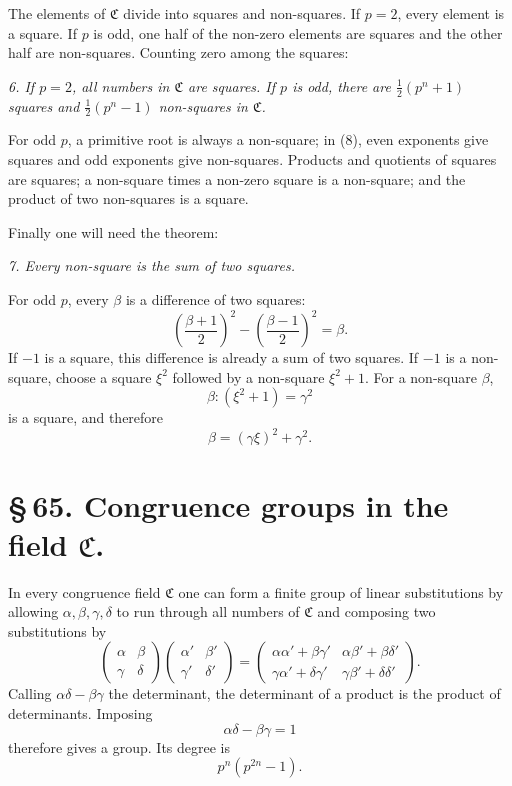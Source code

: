 \documentclass[11pt]{article}
\begin{document}
The elements of $\mathfrak C$ divide into squares and non-squares. If $p=2$, every element is a square. If $p$ is odd, one half of the non-zero elements are squares and the other half are non-squares. Counting zero among the squares:

\emph{6. If $p=2$, all numbers in $\mathfrak C$ are squares. If $p$ is odd, there are $\frac12(p^n+1)$ squares and $\frac12(p^n-1)$ non-squares in $\mathfrak C$.}

For odd $p$, a primitive root is always a non-square; in (8), even exponents give squares and odd exponents give non-squares. Products and quotients of squares are squares; a non-square times a non-zero square is a non-square; and the product of two non-squares is a square.

Finally one will need the theorem:

\emph{7. Every non-square is the sum of two squares.}

For odd $p$, every $\beta$ is a difference of two squares:
\[
 \left(\frac{\beta+1}{2}\right)^2-\left(\frac{\beta-1}{2}\right)^2=\beta.
\]
If $-1$ is a square, this difference is already a sum of two squares. If $-1$ is a non-square, choose a square $\xi^2$ followed by a non-square $\xi^2+1$. For a non-square $\beta$,
\[
 \beta:(\xi^2+1)=\gamma^2
\]
is a square, and therefore
\[
 \beta=(\gamma\xi)^2+\gamma^2.
\]

\section*{\S\,65. Congruence groups in the field $\mathfrak C$.}

In every congruence field $\mathfrak C$ one can form a finite group of linear substitutions by allowing $\alpha,\beta,\gamma,\delta$ to run through all numbers of $\mathfrak C$ and composing two substitutions by
\begin{equation}
 \begin{pmatrix}\alpha&\beta\\\gamma&\delta\end{pmatrix}
 \begin{pmatrix}\alpha'&\beta'\\\gamma'&\delta'\end{pmatrix}
 =
 \begin{pmatrix}
 \alpha\alpha'+\beta\gamma'&\alpha\beta'+\beta\delta'\\
 \gamma\alpha'+\delta\gamma'&\gamma\beta'+\delta\delta'
 \end{pmatrix}. \tag{2}
\end{equation}
Calling $\alpha\delta-\beta\gamma$ the determinant, the determinant of a product is the product of determinants. Imposing
\begin{equation}
 \alpha\delta-\beta\gamma=1 \tag{3}
\end{equation}
therefore gives a group. Its degree is
\begin{equation}
 p^n(p^{2n}-1). \tag{4}
\end{equation}
\end{document}
